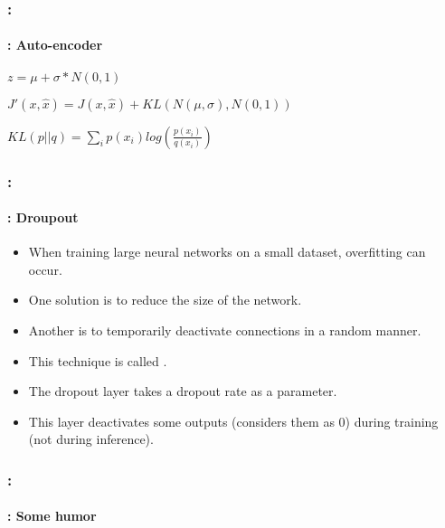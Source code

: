 \documentclass[xcolor=table]{beamer}
\begin{document}
\begin{frame}
	\frametitle{\insertshortsubtitle: \insertsection}
	\framesubtitle{\insertsubsection: Auto-encoder}
	
	\begin{minipage}{0.47\textwidth}
	\end{minipage}
	\hfill
	\begin{minipage}{0.47\textwidth} 
	\end{minipage}
	
	\begin{minipage}{0.52\textwidth}
		\small
		$ z = \mu + \sigma * N(0, 1) $
		
		\vspace{6pt}$ J'(x, \hat{x}) = J(x, \hat{x}) + KL(N(\mu, \sigma), N(0, 1)) $
		
		\vspace{6pt}$ KL(p||q) = \sum_i p(x_i) log(\frac{p(x_i)}{q(x_i)}) $
	\end{minipage}
	\begin{minipage}{0.47\textwidth} 
	\end{minipage}
	
	
\end{frame}

\begin{frame}
	\frametitle{\insertshortsubtitle: \insertsection}
	\framesubtitle{\insertsubsection: Droupout}
	
	\begin{itemize}
		\item When training large neural networks on a small dataset, overfitting can occur.
		\item One solution is to reduce the size of the network.
		\item Another is to temporarily deactivate connections in a random manner.
		\item This technique is called .
		\item The dropout layer takes a dropout rate as a parameter.
		\item This layer deactivates some outputs (considers them as 0) during training (not during inference).
	\end{itemize}
	
\end{frame}

\begin{frame}
	\frametitle{\insertshortsubtitle: \insertsection}
	\framesubtitle{\insertsubsection: Some humor}
	
	\begin{center}
	\end{center}
	
\end{frame}
\end{document}
